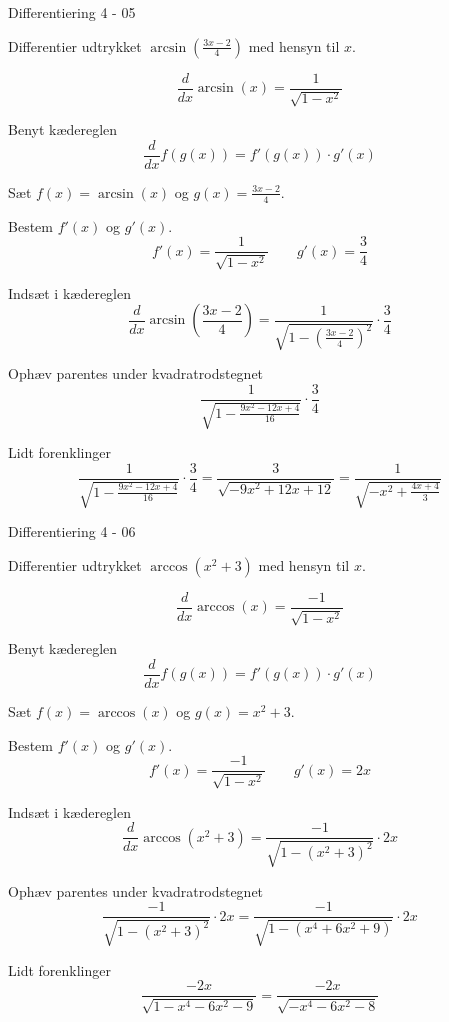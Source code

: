 \documentclass{article}
\begin{document}
\begin{exercise}{Differentiering 4 - 05}
	
	Differentier udtrykket $\arcsin\left( \frac{3x - 2}{4} \right)$ med hensyn til $x$.
	
	
	\hint
	\[
	\frac{d}{dx} \arcsin(x) = \frac{1}{\sqrt{1 - x^2}}
	\]
	
	
	\hint
	Benyt kædereglen
	\[
	\frac{d}{dx} f(g(x)) = f'(g(x)) \cdot g'(x)
	\]
	
	\hint
	Sæt $f(x) = \arcsin(x)$ og $g(x) = \frac{3x - 2}{4}$.
	
	\hint
	Bestem $f'(x)$ og $g'(x)$.
	\[
	f'(x) = \frac{1}{\sqrt{1 - x^2}} \qquad g'(x) = \frac{3}{4}
	\]
	
	\hint
	Indsæt i kædereglen
	\[
	\frac{d}{dx} \arcsin\left( \frac{3x - 2}{4} \right) = \frac{1}{\sqrt{1 - \left( \frac{3x - 2}{4}\right)^2}} \cdot \frac{3}{4}
	\]
	
	\hint
	Ophæv parentes under kvadratrodstegnet
	\[
	\frac{1}{\sqrt{1 - \frac{9x^2 - 12x + 4}{16}}} \cdot \frac{3}{4} 
	\]
	
	\hint
	Lidt forenklinger
	\[
	\frac{1}{\sqrt{1 - \frac{ 9x^2 - 12x + 4}{16}}} \cdot \frac{3}{4} = \frac{3}{\sqrt{- 9x^2 + 12x + 12}}  = \frac{1}{\sqrt{-x^2 + \frac{4x + 4}{3}}}
	\]
\end{exercise}

\begin{exercise}{Differentiering 4 - 06}

	Differentier udtrykket $\arccos\left( x^2 + 3 \right)$ med hensyn til $x$.
	
	
	\hint
	\[
	\frac{d}{dx} \arccos(x) = \frac{-1}{\sqrt{1 - x^2}}
	\]
	
	
	\hint
	Benyt kædereglen
	\[
	\frac{d}{dx} f(g(x)) = f'(g(x)) \cdot g'(x)
	\]
	
	\hint
	Sæt $f(x) = \arccos(x)$ og $g(x) = x^2 + 3$.
	
	\hint
	Bestem $f'(x)$ og $g'(x)$.
	\[
	f'(x) = \frac{-1}{\sqrt{1 - x^2}} \qquad g'(x) = 2x
	\]
	
	\hint
	Indsæt i kædereglen
	\[
	\frac{d}{dx} \arccos\left( x^2 + 3 \right) = \frac{-1}{\sqrt{1 - \left( x^2 + 3 \right)^2}} \cdot 2x
	\]
	
	\hint
	Ophæv parentes under kvadratrodstegnet
	\[
	\frac{-1}{\sqrt{1 - \left( x^2 + 3 \right)^2}} \cdot 2x = \frac{-1}{\sqrt{1 - \left( x^4 + 6x^2 + 9 \right)}} \cdot 2x
	\]
	
	\hint
	Lidt forenklinger
	\[
	\frac{-2x}{\sqrt{1 - x^4 - 6x^2 - 9}} = \frac{-2x}{\sqrt{- x^4 - 6x^2 - 8}} 
	\]
\end{exercise}
\end{document}
